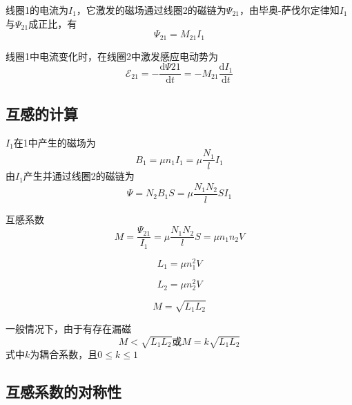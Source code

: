 \documentclass[
	12pt, %
	a4paper, %
]{myLegrandOrangeBook}
\newcommand{\rmd}{\mathrm{d}}
\newcommand{\deriv}[2]{\frac{\rmd #1}{\rmd #2}}
\begin{document}
线圈1的电流为\(I_1\)，它激发的磁场通过线圈2的磁链为\(\varPsi_{21}\)，由毕奥-萨伐尔定律知\(I_1\)与\(\varPsi_{21}\)成正比，有
\begin{equation}
    \varPsi_{21} = M_{21} I_1
\end{equation}

线圈1中电流变化时，在线圈2中激发感应电动势为
\begin{equation}
    \mathscr{E}_{21} = - \deriv{\varPsi{21}}{t} = -M_{21} \deriv{I_1}{t}
\end{equation}

\subsection{互感的计算}

\(I_1\)在1中产生的磁场为
\begin{equation}
    B_1 = \mu n_1 I_1 = \mu \frac{N_1}{l} I_1
\end{equation}
由\(I_1\)产生并通过线圈2的磁链为
\begin{equation}
    \varPsi = N_2 B_1 S = \mu \frac{N_1 N_2}{l} S I_1
\end{equation}

互感系数
\begin{equation}
    M = \frac{\varPsi_{21}}{I_1} = \mu \frac{N_1 N_2}{l} S = \mu n_1 n_2 V
\end{equation}

\begin{equation*}
    L_1 = \mu n_1^2 V
\end{equation*}

\begin{equation*}
    L_2 = \mu n_2^2 V
\end{equation*}

\begin{equation}
    M = \sqrt{L_1 L_2}
\end{equation}

一般情况下，由于有存在漏磁
\begin{equation}
    M < \sqrt{L_1 L_2} \text{或} M = k \sqrt{L_1 L_2}
\end{equation}
式中\(k\)为耦合系数，且\(0 \leq k \leq 1\)

\subsection{互感系数的对称性}
\end{document}
